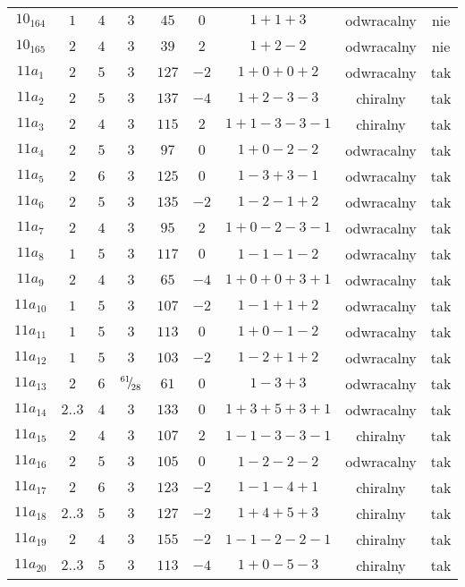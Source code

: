 \begin{longtable}{ccccccccc}
$10_{164}$ & $1$ & $4$ & $3$ & $45$ & $0$ & $1+1+3$ & odwracalny & nie \\
$10_{165}$ & $2$ & $4$ & $3$ & $39$ & $2$ & $1+2-2$ & odwracalny & nie \\
$11a_{1}$ & $2$ & $5$ & $3$ & $127$ & $-2$ & $1+0+0+2$ & odwracalny & tak \\
$11a_{2}$ & $2$ & $5$ & $3$ & $137$ & $-4$ & $1+2-3-3$ & chiralny & tak \\
$11a_{3}$ & $2$ & $4$ & $3$ & $115$ & $2$ & $1+1-3-3-1$ & chiralny & tak \\
$11a_{4}$ & $2$ & $5$ & $3$ & $97$ & $0$ & $1+0-2-2$ & odwracalny & tak \\
$11a_{5}$ & $2$ & $6$ & $3$ & $125$ & $0$ & $1-3+3-1$ & odwracalny & tak \\
$11a_{6}$ & $2$ & $5$ & $3$ & $135$ & $-2$ & $1-2-1+2$ & odwracalny & tak \\
$11a_{7}$ & $2$ & $4$ & $3$ & $95$ & $2$ & $1+0-2-3-1$ & odwracalny & tak \\
$11a_{8}$ & $1$ & $5$ & $3$ & $117$ & $0$ & $1-1-1-2$ & odwracalny & tak \\
$11a_{9}$ & $2$ & $4$ & $3$ & $65$ & $-4$ & $1+0+0+3+1$ & odwracalny & tak \\
$11a_{10}$ & $1$ & $5$ & $3$ & $107$ & $-2$ & $1-1+1+2$ & odwracalny & tak \\
$11a_{11}$ & $1$ & $5$ & $3$ & $113$ & $0$ & $1+0-1-2$ & odwracalny & tak \\
$11a_{12}$ & $1$ & $5$ & $3$ & $103$ & $-2$ & $1-2+1+2$ & odwracalny & tak \\
$11a_{13}$ & $2$ & $6$ & ${}^{61}{\mskip -5mu/\mskip -3mu}_{28}$ & $61$ & $0$ & $1-3+3$ & odwracalny & tak \\
$11a_{14}$ & $2..3$ & $4$ & $3$ & $133$ & $0$ & $1+3+5+3+1$ & odwracalny & tak \\
$11a_{15}$ & $2$ & $4$ & $3$ & $107$ & $2$ & $1-1-3-3-1$ & chiralny & tak \\
$11a_{16}$ & $2$ & $5$ & $3$ & $105$ & $0$ & $1-2-2-2$ & odwracalny & tak \\
$11a_{17}$ & $2$ & $6$ & $3$ & $123$ & $-2$ & $1-1-4+1$ & chiralny & tak \\
$11a_{18}$ & $2..3$ & $5$ & $3$ & $127$ & $-2$ & $1+4+5+3$ & chiralny & tak \\
$11a_{19}$ & $2$ & $4$ & $3$ & $155$ & $-2$ & $1-1-2-2-1$ & chiralny & tak \\
$11a_{20}$ & $2..3$ & $5$ & $3$ & $113$ & $-4$ & $1+0-5-3$ & chiralny & tak \\

\end{longtable}
